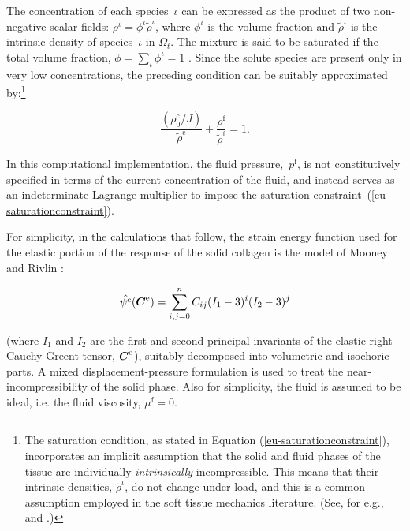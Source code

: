 The concentration of each species~$\iota$ can be expressed as the
product of two non-negative scalar fields: $\rho^\iota = \phi^\iota
\tilde{\rho}^\iota$, where $\phi^\iota$ is the volume fraction and
$\tilde{\rho}^\iota$ is the intrinsic density of species~$\iota$ in
$\Omega_{t}$. The mixture is said to be saturated if the total volume
fraction, \mbox{$\phi = \sum\limits_{\iota}\phi^\iota = 1$}
\citep{passmanetal}. Since the solute species are present only in very
low concentrations, the preceding condition can be suitably
approximated by:\footnote{The saturation condition, as stated in
  Equation (\ref{eu-saturationconstraint}), incorporates an implicit
  assumption that the solid and fluid phases of the tissue are
  individually {\em intrinsically} incompressible. This means that
  their intrinsic densities, $\tilde{\rho}^\iota$, do not change under
  load, and this is a common assumption employed in the soft tissue
  mechanics literature. (See, for e.g., \citet{mowetal1980} and
  \citet{ateshian07}.)}

\begin{equation}
\frac{\left(\rho_{0}^{\mathrm{c}}/J\right)}
{\tilde{\rho}^{\mathrm{c}}} + 
\frac{\rho^{\mathrm{f}}}{\tilde{\rho}^{\mathrm{f}}} = 1.
\label{eu-saturationconstraint}
\end{equation}

\noindent In this computational implementation, the fluid
pressure,~$p^{\mathrm{f}}$, is not constitutively specified in terms
of the current concentration of the fluid, and instead serves as an
indeterminate Lagrange multiplier to impose the saturation
constraint~(\ref{eu-saturationconstraint}).

For simplicity, in the calculations that follow, the strain energy
function used for the elastic portion of the response of the solid
collagen is the model of Mooney and Rivlin \citep{mooney1940}:

\begin{equation}
\hat{\psi^{\mathrm{c}}} (\mbox{\boldmath$ C$}^{\mathrm{e}}) = \sum\limits_{i,j=0}^{n}
C_{ij} (I_{1}-3)^{i} (I_{2}-3)^{j}
\label{mooney-rivlin-model}
\end{equation}

\noindent (where $I_{1}$ and $I_{2}$ are the first and second
principal invariants of the elastic right Cauchy-Greent tensor,
$\mbox{\boldmath$ C$}^{\mathrm{e}}$), suitably decomposed into volumetric and isochoric
parts. A mixed displacement-pressure \citep{ZienkTay:89} formulation
is used to treat the near-incompressibility of the solid phase. Also
for simplicity, the fluid is assumed to be ideal, i.e. the fluid
viscosity, $\mu^{\mathrm{f}}=0$.

